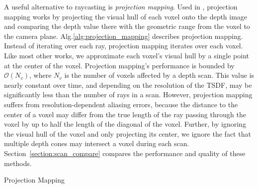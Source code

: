 \documentclass[conference]{IEEEtran}
\newcommand{\sref}[1]{Section~\ref{#1}}
\newcommand{\algoref}[1]{Alg.\ref{#1}}
\newcommand{\TSDF}{TSDF\xspace}
\begin{document}
A useful alternative to raycasting is \textit{projection mapping}. Used in
\cite{Newcombe,Nguyen2012, Bylow2013, Klingensmith2014}, projection mapping
works by projecting the visual hull of each voxel onto the depth image and
comparing the depth value there with the geometric range from the voxel to
the camera plane. \algoref{alg:projection_mapping} describes projection mapping.
Instead of iterating over each ray, projection mapping iterates over each voxel.
Like most other works, we approximate each voxel's visual hull by a single point
at the center of the voxel. Projection mapping's performance is bounded by
$\mathcal{O}(N_v)$, where $N_v$ is the number of voxels affected by a depth
scan. This value is nearly constant over time, and depending on the resolution
of the \TSDF, may be significantly less than the number of rays in a scan. 
However, projection mapping suffers from resolution-dependent  aliasing errors,
because the distance to the center of a voxel may differ from the true length 
of the ray passing through the voxel by up to half the length of the diagonal of
the voxel.  Further, by ignoring the visual hull of the voxel and only projecting
its center, we ignore the fact that multiple depth cones may intersect a voxel
during each scan. \sref{section:scan_compare} compares the performance and
quality of these methods.

\begin{algorithm} 
	\caption{Projection Mapping}
	\label{alg:projection_mapping}
	\begin{algorithmic}[1]
		 
		  
	     
		    	\label{alg:line:voxel_carve}
			\EndIf
	    \EndIf
		  
			\label{alg:line:tsdf_update}
		\EndIf
	\EndFor
	\end{algorithmic}
\end{algorithm}
\end{document}
